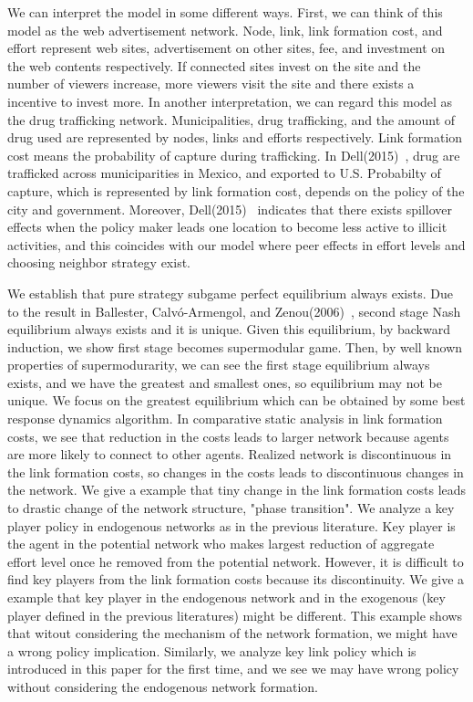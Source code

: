 \documentclass[12pt]{article}
\theoremstyle{definition}
\begin{document}
We can interpret the model in some different ways.
First, we can think of this model as the web advertisement network.
Node, link, link formation cost, and effort represent web sites, advertisement on other sites, fee, and investment on the web contents respectively.
If connected sites invest on the site and the number of viewers increase, more viewers visit the site and there exists a incentive to invest more.
In another interpretation, we can regard this model as the drug trafficking network.
Municipalities, drug trafficking, and the amount of drug used are represented by nodes, links and efforts respectively.
Link formation cost means the probability of capture during trafficking.
In Dell(2015)~\cite{Dell}, drug are trafficked across municiparities in Mexico, and exported to U.S.
Probabilty of capture, which is represented by  link formation cost, depends on the policy of the city and government.
Moreover, Dell(2015)~\cite{Dell} indicates that there exists spillover effects when the policy maker leads one location to become less active to illicit activities, and this coincides with our model where peer effects in effort levels and choosing neighbor strategy exist.

We establish that pure strategy subgame perfect equilibrium always exists.
Due to the result in Ballester, Calv\'{o}-Armengol, and Zenou(2006)~\cite{whowho}, second stage Nash equilibrium always exists and it is unique.
Given this equilibrium, by backward induction, we show first stage becomes supermodular game.
Then, by well known properties of supermodurarity, we can see the first stage equilibrium always exists, and we have the greatest and smallest ones, so equilibrium may not be unique.
We focus on the greatest equilibrium which can be obtained by some best response dynamics algorithm.
In comparative static analysis in link formation costs, we see that reduction in the costs leads to larger network because agents are more likely to connect to other agents.
Realized network is discontinuous in the link formation costs, so changes in the costs leads to discontinuous changes in the network.
We give a example that tiny change in the link formation costs leads to drastic change of the network structure, "phase transition".
We analyze a key player policy in endogenous networks as in the previous literature.
Key player is the agent in the potential network who makes largest reduction of aggregate effort level once he removed from the potential network.
However, it is difficult to find key players from the link formation costs because its discontinuity.
We give a example that key player in the endogenous network and in the exogenous (key player defined in the previous literatures) might be different.
This example shows that witout considering the mechanism of the network formation, we might have a wrong policy implication.
Similarly, we analyze key link policy which is introduced in this paper for the first time, and we see we may have wrong policy without considering the endogenous network formation.
\end{document}
